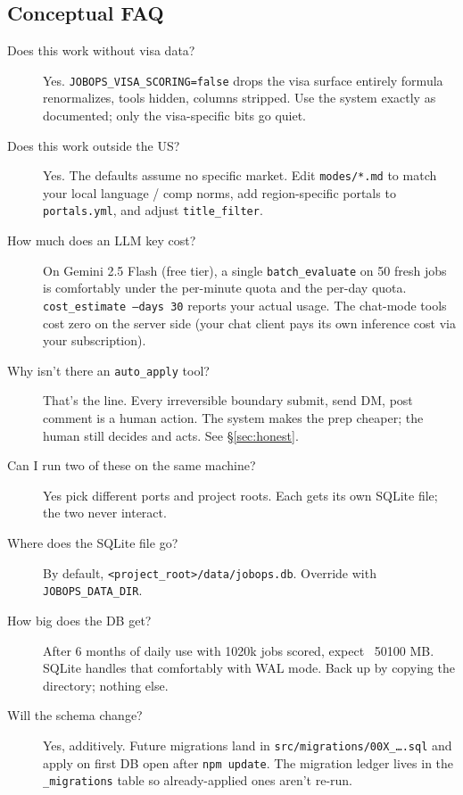 \documentclass[11pt,letterpaper]{article}
\newcommand{\tool}[1]{\texttt{#1}}
\newcommand{\fpath}[1]{\texttt{#1}}
\newcommand{\env}[1]{\texttt{#1}}
\begin{document}
\subsection*{Conceptual FAQ}

\begin{description}
\item[Does this work without visa data?] Yes. \env{JOBOPS\_VISA\_SCORING=false} drops the visa surface entirely \textemdash{} formula renormalizes, tools hidden, columns stripped. Use the system exactly as documented; only the visa-specific bits go quiet.

\item[Does this work outside the US?] Yes. The defaults assume no specific market. Edit \fpath{modes/*.md} to match your local language / comp norms, add region-specific portals to \fpath{portals.yml}, and adjust \texttt{title\_filter}.

\item[How much does an LLM key cost?] On Gemini 2.5 Flash (free tier), a single \tool{batch\_evaluate} on 50 fresh jobs is comfortably under the per-minute quota and the per-day quota. \tool{cost\_estimate --days 30} reports your actual usage. The chat-mode tools cost zero on the server side (your chat client pays its own inference cost via your subscription).

\item[Why isn't there an \texttt{auto\_apply} tool?] That's the line. Every irreversible boundary \textemdash{} submit, send DM, post comment \textemdash{} is a human action. The system makes the prep cheaper; the human still decides and acts. See \S\ref{sec:honest}.

\item[Can I run two of these on the same machine?] Yes \textemdash{} pick different ports and project roots. Each gets its own SQLite file; the two never interact.

\item[Where does the SQLite file go?] By default, \texttt{<project\_root>/data/jobops.db}. Override with \env{JOBOPS\_DATA\_DIR}.

\item[How big does the DB get?] After 6 months of daily use with 10\textendash{}20k jobs scored, expect ~50\textendash{}100 MB. SQLite handles that comfortably with WAL mode. Back up by copying the directory; nothing else.

\item[Will the schema change?] Yes, additively. Future migrations land in \fpath{src/migrations/00X\_\dots.sql} and apply on first DB open after \texttt{npm update}. The migration ledger lives in the \texttt{\_migrations} table so already-applied ones aren't re-run.
\end{description}
\end{document}
